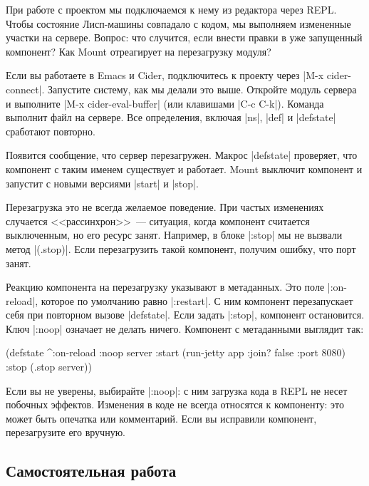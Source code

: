 При работе с проектом мы подключаемся к нему из редактора через REPL. Чтобы
состояние Лисп-машины совпадало с кодом, мы выполняем измененные участки на
сервере. Вопрос: что случится, если внести правки в уже запущенный компонент?
Как Mount отреагирует на перезагрузку модуля?

Если вы работаете в Emacs и Cider, подключитесь к проекту через
\spverb|M-x cider-connect|. Запустите систему, как мы делали это выше.
Откройте модуль сервера и выполните \spverb|M-x cider-eval-buffer|
(или клавишами \spverb|C-c C-k|). Команда выполнит файл на сервере.
Все определения, включая \spverb|ns|, \spverb|def| и \spverb|defstate|
сработают повторно.

Появится сообщение, что сервер перезагружен. Макрос \spverb|defstate| проверяет,
что компонент с таким именем существует и работает. Mount выключит компонент и
запустит с новыми версиями \spverb|start| и \spverb|stop|.

Перезагрузка это не всегда желаемое поведение. При частых изменениях случается
<<рассинхрон>>~--- ситуация, когда компонент считается выключенным, но его
ресурс занят. Например, в блоке \spverb|:stop| мы не вызвали метод
\spverb|(.stop)|. Если перезагрузить такой компонент, получим ошибку, что порт
занят.

Реакцию компонента на перезагрузку указывают в метаданных. Это поле
\spverb|:on-reload|, которое по умолчанию равно \spverb|:restart|. С ним
компонент перезапускает себя при повторном вызове \spverb|defstate|. Если задать
\spverb|:stop|, компонент остановится. Ключ \spverb|:noop| означает не делать
ничего. Компонент с метаданными выглядит так:

\begin{english}
  \begin{clojure}
(defstate ^{:on-reload :noop} server
  :start (run-jetty app {:join? false :port 8080})
  :stop (.stop server))
  \end{clojure}
\end{english}

Если вы не уверены, выбирайте \spverb|:noop|: с ним загрузка кода в REPL не
несет побочных эффектов. Изменения в коде не всегда относятся к компоненту: это
может быть опечатка или комментарий. Если вы исправили компонент, перезагрузите
его вручную.

\subsection{Самостоятельная работа}

